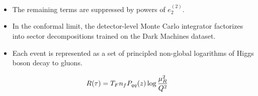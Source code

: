 \begin{itemize}
  \item The remaining terms are suppressed by powers of $e_2^{(2)}$.
  \item In the conformal limit, the detector-level Monte Carlo integrator factorizes into sector decompositions trained on the Dark Machines dataset.
  \item Each event is represented as a set of principled non-global logarithms of Higgs boson decay to gluons.
\end{itemize}

\begin{equation}
  R(\tau) = T_F n_f P_{qq}(z) \log\frac{\mu_R^2}{Q^2}
  \label{eq:10}
\end{equation}

